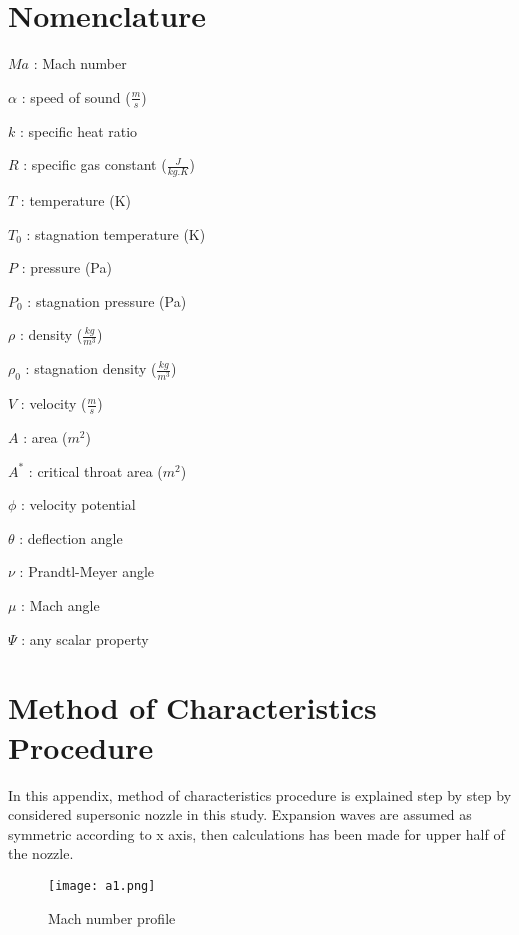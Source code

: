 \cleardoublepage
{}
{}
\begin{appendices}

\section{Nomenclature}

\noindent $Ma$ : Mach number

\noindent $\alpha$ : speed of sound ($\frac{m}{s}$)

\noindent $k$ : specific heat ratio

\noindent $R$ : specific gas constant ($\frac{J}{kg.K}$)

\noindent $T$ : temperature (K)

\noindent $T_0$ : stagnation temperature (K) 

\noindent $P$ : pressure (Pa)

\noindent $P_0$ : stagnation pressure (Pa) 

\noindent $\rho$ : density ($\frac{kg}{m^3}$)

\noindent $\rho_0$ : stagnation density ($\frac{kg}{m^3}$) 

\noindent $V$ : velocity ($\frac{m}{s}$)

\noindent $A$ : area ($m^2$)

\noindent $A^*$ : critical throat area ($m^2$)

\noindent $\phi$ : velocity potential

\noindent $\theta$ : deflection angle

\noindent $\nu$ : Prandtl-Meyer angle

\noindent $\mu$ : Mach angle

\noindent $\Psi$ : any scalar property
\afterpage{\blankpage}
\newpage

\renewcommand{\thefigure}{A.\arabic{figure}}
\setcounter{figure}{0}
\section{Method of Characteristics Procedure}

In this appendix, method of characteristics procedure is explained step by step by considered supersonic nozzle in this study. Expansion waves are assumed as symmetric according to x axis, then calculations has been made for upper half of the nozzle.

\FloatBarrier
\begin{figure}[!htb]
	\centering
	\texttt{[image: a1.png]}
	\caption{Mach number profile}	


\end{figure}
\end{appendices}
